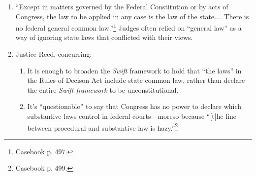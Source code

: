 \begin{enumerate}
\begin{enumerate}
        mistakenly interpreted the Rules of Decision Act as requiring federal 
        courts to follow state common law even in areas where federal common 
        law applied.)
        \item \emph{Swift} caused significant ``injustice and 
        confusion''\footnote{Casebook p. 501}---e.g., companies 
        reincorporating in other states in order to establish diversity 
        jurisdiction to have their cases tried in federal court (\emph{Black 
        \& White Taxicab}). ``\emph{Swift v. Tyson} introduced grave 
        discrimination by noncitizens against citizens.''\footnote{Casebook p. 
        496.}
        \item The federal government did not have the power to legislate rules 
        of tort or contract law.\footnote{This quickly became untrue as the 
        Court expanded the federal government's power to regulate these areas 
        under the Commerce Clause.} Federal courts also do not have the power 
        to create rules in these areas.
        \item Reversed and remanded to be decided on the basis of Pennsylvania 
        state law.
        \item The \emph{Swift} rule is overturned.
    \end{enumerate}
    \item ``Except in matters governed by the Federal Constitution or by acts 
    of Congress, the law to be applied in any case is the law of the state....  
    There is no federal general common law.''\footnote{Casebook p. 497.} 
    Judges often relied on ``general law'' as a way of ignoring state laws 
    that conflicted with their views.
    \item Justice Reed, concurring:
    \begin{enumerate}
        \item It is enough to broaden the \emph{Swift} framework to hold that 
        ``the laws'' in the Rules of Decison Act include state common law, 
        rather than declare the entire \emph{Swift framework} to be 
        unconstitutional.
        \item It's ``questionable'' to say that Congress has no power to 
        declare which substantive laws control in federal courts---moreso 
        because ``[t]he line between procedural and substantive law is 
        hazy.''\footnote{Casebook p. 499.}
    \end{enumerate}
\end{enumerate}

